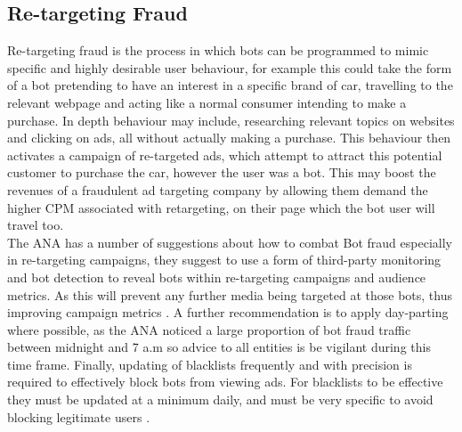 \documentclass[12pt]{article}
\begin{document}
\subsection{Re-targeting Fraud}
Re-targeting fraud is the process in which bots can be programmed to mimic specific and highly desirable user behaviour, for example this could take the form of a bot pretending to have an interest in a specific brand of car, travelling to the relevant webpage and acting like a normal consumer intending to make a purchase. In depth behaviour may include, researching relevant topics on websites and clicking on ads, all without actually making a purchase. This behaviour then activates a campaign of re-targeted ads, which attempt to attract this potential customer to purchase the car, however the user was a bot. This may boost the revenues of a fraudulent ad targeting company by allowing them demand the higher CPM associated with retargeting, on their page which the bot user will travel too. \\

The ANA has a number of suggestions about how to combat Bot fraud especially in re-targeting campaigns, they suggest to use a form of third-party monitoring and bot detection to reveal bots within re-targeting campaigns and audience metrics. As this will prevent any further media being targeted at those bots, thus improving campaign metrics \parencite{botfraud2015}. A further recommendation is to apply day-parting where possible, as the ANA noticed a large proportion of bot fraud traffic between midnight and 7 a.m so advice to all entities is be vigilant during this time frame. Finally, updating of blacklists frequently and with precision is required to effectively block bots from viewing ads. For blacklists to be effective they must be updated at a minimum daily, and must be very specific to avoid blocking legitimate users \parencite{botfraud2015}.  
\end{document}
